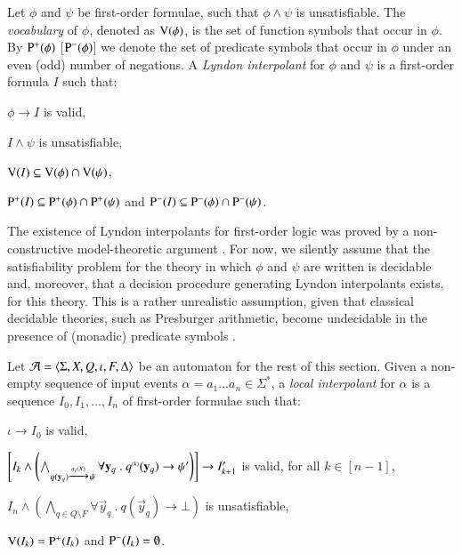 \documentclass{llncs}
\begin{document}
Let $\phi$ and $\psi$ be first-order formulae, such that $\phi \wedge
\psi$ is unsatisfiable. The \emph{vocabulary} of $\phi$, denoted as
$\mathrm{V}({\phi})$, is the set of function symbols that occur in $\phi$.  By
$\mathrm{P}^{+}(\phi)$ [$\mathrm{P}^{-}(\phi)$] we denote the set of predicate
symbols that occur in $\phi$ under an even (odd) number of
negations. A \emph{Lyndon interpolant} \cite{Lyndon59} for $\phi$ and
$\psi$ is a first-order formula $I$ such that: \begin{compactitem}
\item $\phi \rightarrow I$ is valid,  
\item $I \wedge \psi$ is unsatisfiable, 
\item $\mathrm{V}({I}) \subseteq \mathrm{V}({\phi}) \cap \mathrm{V}({\psi})$, 
\item $\mathrm{P}^{+}(I) \subseteq \mathrm{P}^{+}(\phi) \cap \mathrm{P}^{+}(\psi)$ and
  $\mathrm{P}^{-}(I) \subseteq \mathrm{P}^{-}(\phi) \cap \mathrm{P}^{-}(\psi)$.
\end{compactitem}
The existence of Lyndon interpolants for first-order logic was proved
by a non-constructive model-theoretic argument \cite{Lyndon59}. For
now, we silently assume that the satisfiability problem for the theory
in which $\phi$ and $\psi$ are written is decidable and, moreover,
that a decision procedure generating Lyndon interpolants exists, for
this theory. This is a rather unrealistic assumption, given that
classical decidable theories, such as Presburger arithmetic, become
undecidable in the presence of (monadic) predicate symbols
\cite{Halpern91}.

Let $\mathcal{A} = \langle \Sigma,X,Q,\iota,F,\Delta \rangle$ be an automaton for the
rest of this section. Given a non-empty sequence of input events
$\alpha = a_1 \ldots a_n \in \Sigma^*$, a \emph{local interpolant} for
$\alpha$ is a sequence $I_0,I_1,\ldots,I_n$ of first-order formulae
such that: \begin{compactitem}
\item $\iota \rightarrow I_0$ is valid, 
%
\item $\left[I_k \wedge \left(\bigwedge_{q(\mathbf y_q) \xrightarrow{{\scriptscriptstyle a_i(X)}}_{{\scriptstyle }} \psi}
  \forall \mathbf y_q ~.~ {q}^{\scriptscriptstyle{({k})}}(\mathbf y_q) \rightarrow
  {\psi}^\prime\right)\right] \rightarrow {I}^\prime_{k+1}$ is valid, for all $k \in [n-1]$,
%
\item $I_n \wedge \left(\bigwedge_{q \in Q \setminus F} \forall \vec{y}_q
  ~.~ q(\vec{y}_q) \rightarrow \bot\right)$ is unsatisfiable,
%
\item $\mathrm{V}({I_k}) = \mathrm{P}^{+}(I_k)$ and $\mathrm{P}^{-}(I_k) = \emptyset$. 
\end{compactitem}
\end{document}
